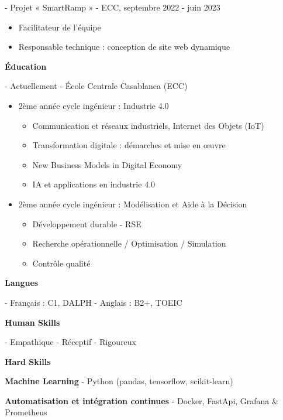 \documentclass[11pt]{article}
\newcommand{\subsectiontitle}[1]{\noindent\textbf{#1}}
\begin{document}
\begin{multicols}{2}
- Projet « SmartRamp » - ECC, septembre 2022 - juin 2023
\begin{itemize}[topsep=0pt, partopsep=0pt, parsep=0pt, leftmargin=1.2cm]
    \item Facilitateur de l'équipe
    \item Responsable technique : conception de site web dynamique
\end{itemize}

\subsectiontitle{Éducation}

- Actuellement - École Centrale Casablanca (ECC)
\begin{itemize}[topsep=0pt, partopsep=0pt, parsep=0pt, leftmargin=1.2cm]
    \item 2ème année cycle ingénieur : Industrie 4.0
        \begin{itemize}[topsep=0pt, partopsep=0pt, parsep=0pt]
            \item Communication et réseaux industriels, Internet des Objets (IoT)
            \item Transformation digitale : démarches et mise en œuvre
            \item New Business Models in Digital Economy
            \item IA et applications en industrie 4.0
        \end{itemize}

    \item 2ème année cycle ingénieur : Modélisation et Aide à la Décision
        \begin{itemize}[topsep=0pt, partopsep=0pt, parsep=0pt]
            \item Développement durable - RSE
            \item Recherche opérationnelle / Optimisation / Simulation
            \item Contrôle qualité
        \end{itemize}
\end{itemize}

\subsectiontitle{Langues}

- Français : C1, DALPH
- Anglais : B2+, TOEIC

\subsectiontitle{Human Skills}

- Empathique
- Réceptif
- Rigoureux

\subsectiontitle{Hard Skills}

\textbf{Machine Learning}
- Python (pandas, tensorflow, scikit-learn)

\textbf{Automatisation et intégration continues}
- Docker, FastApi, Grafana & Prometheus


\end{multicols}
\end{document}
